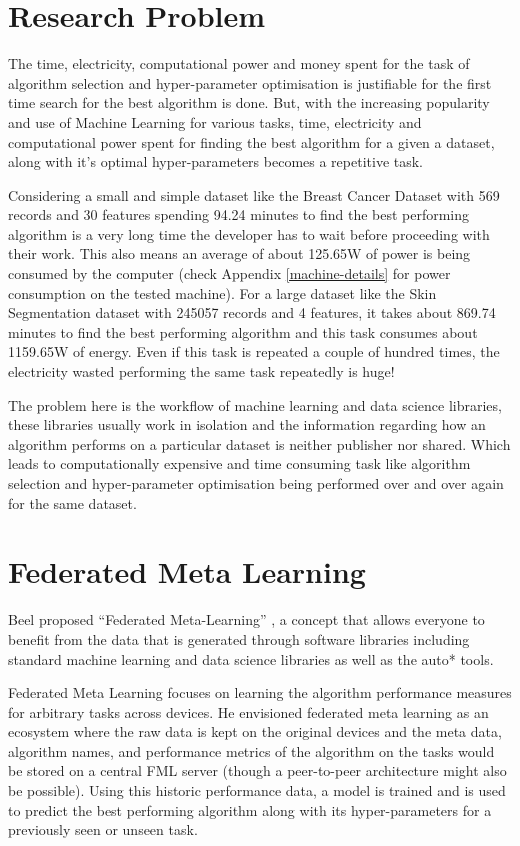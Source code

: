 \section{Research Problem}
The time, electricity, computational power and money spent for the task of algorithm selection and hyper-parameter optimisation is justifiable for the first time search for the best algorithm is done. But, with the increasing popularity and use of Machine Learning for various tasks, time, electricity and computational power spent for finding the best algorithm for a given a dataset, along with it's optimal hyper-parameters becomes a repetitive task. 

Considering a small and simple dataset like the Breast Cancer Dataset with 569 records and 30 features spending 94.24 minutes to find the best performing algorithm is a very long time the developer has to wait before proceeding with their work. This also means an average of about 125.65W of power is being consumed by the computer (check Appendix \ref{machine-details} for power consumption on the tested machine). For a large dataset like the Skin Segmentation dataset with 245057 records and 4 features, it takes about 869.74 minutes to find the best performing algorithm and this task consumes about 1159.65W of energy. Even if this task is repeated a couple of hundred times, the electricity wasted performing the same task repeatedly is huge!

The problem here is the workflow of machine learning and data science libraries, these libraries usually work in isolation and the information regarding how an algorithm performs on a particular dataset is neither publisher nor shared. Which leads to computationally expensive and time consuming task like algorithm selection and hyper-parameter optimisation being performed over and over again for the same dataset.

\section{Federated Meta Learning}
Beel proposed “Federated Meta-Learning” \citep{fml}, a concept that allows everyone to benefit from the data that is generated through software libraries including standard machine learning and data science libraries as well as the auto* tools. 

Federated Meta Learning focuses on learning the algorithm performance measures for arbitrary tasks across devices. He envisioned federated meta learning as an ecosystem where the raw data is kept on the original  devices and the meta data, algorithm names, and performance metrics of the algorithm on the tasks would be stored on a central FML server (though a peer-to-peer architecture might also be possible). Using this historic performance data, a model is trained and is used to predict the best performing algorithm along with its hyper-parameters for a previously seen or unseen task.


